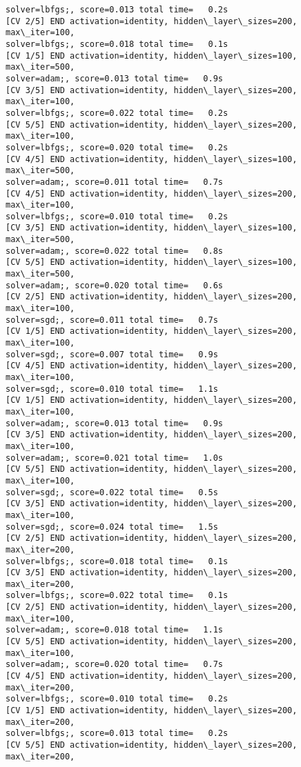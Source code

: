 \documentclass[11pt]{article}
\begin{document}
\begin{Verbatim}[commandchars=\\\{\}]
solver=lbfgs;, score=0.013 total time=   0.2s
[CV 2/5] END activation=identity, hidden\_layer\_sizes=200, max\_iter=100,
solver=lbfgs;, score=0.018 total time=   0.1s
[CV 1/5] END activation=identity, hidden\_layer\_sizes=100, max\_iter=500,
solver=adam;, score=0.013 total time=   0.9s
[CV 3/5] END activation=identity, hidden\_layer\_sizes=200, max\_iter=100,
solver=lbfgs;, score=0.022 total time=   0.2s
[CV 5/5] END activation=identity, hidden\_layer\_sizes=200, max\_iter=100,
solver=lbfgs;, score=0.020 total time=   0.2s
[CV 4/5] END activation=identity, hidden\_layer\_sizes=100, max\_iter=500,
solver=adam;, score=0.011 total time=   0.7s
[CV 4/5] END activation=identity, hidden\_layer\_sizes=200, max\_iter=100,
solver=lbfgs;, score=0.010 total time=   0.2s
[CV 3/5] END activation=identity, hidden\_layer\_sizes=100, max\_iter=500,
solver=adam;, score=0.022 total time=   0.8s
[CV 5/5] END activation=identity, hidden\_layer\_sizes=100, max\_iter=500,
solver=adam;, score=0.020 total time=   0.6s
[CV 2/5] END activation=identity, hidden\_layer\_sizes=200, max\_iter=100,
solver=sgd;, score=0.011 total time=   0.7s
[CV 1/5] END activation=identity, hidden\_layer\_sizes=200, max\_iter=100,
solver=sgd;, score=0.007 total time=   0.9s
[CV 4/5] END activation=identity, hidden\_layer\_sizes=200, max\_iter=100,
solver=sgd;, score=0.010 total time=   1.1s
[CV 1/5] END activation=identity, hidden\_layer\_sizes=200, max\_iter=100,
solver=adam;, score=0.013 total time=   0.9s
[CV 3/5] END activation=identity, hidden\_layer\_sizes=200, max\_iter=100,
solver=adam;, score=0.021 total time=   1.0s
[CV 5/5] END activation=identity, hidden\_layer\_sizes=200, max\_iter=100,
solver=sgd;, score=0.022 total time=   0.5s
[CV 3/5] END activation=identity, hidden\_layer\_sizes=200, max\_iter=100,
solver=sgd;, score=0.024 total time=   1.5s
[CV 2/5] END activation=identity, hidden\_layer\_sizes=200, max\_iter=200,
solver=lbfgs;, score=0.018 total time=   0.1s
[CV 3/5] END activation=identity, hidden\_layer\_sizes=200, max\_iter=200,
solver=lbfgs;, score=0.022 total time=   0.1s
[CV 2/5] END activation=identity, hidden\_layer\_sizes=200, max\_iter=100,
solver=adam;, score=0.018 total time=   1.1s
[CV 5/5] END activation=identity, hidden\_layer\_sizes=200, max\_iter=100,
solver=adam;, score=0.020 total time=   0.7s
[CV 4/5] END activation=identity, hidden\_layer\_sizes=200, max\_iter=200,
solver=lbfgs;, score=0.010 total time=   0.2s
[CV 1/5] END activation=identity, hidden\_layer\_sizes=200, max\_iter=200,
solver=lbfgs;, score=0.013 total time=   0.2s
[CV 5/5] END activation=identity, hidden\_layer\_sizes=200, max\_iter=200,

\end{Verbatim}
\end{document}
